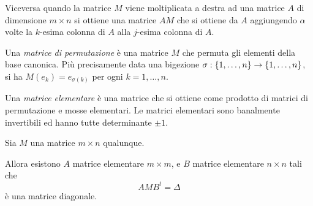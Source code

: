 \begin{definition}
Viceversa quando la matrice $M$ viene moltiplicata a destra ad una matrice $A$ di dimensione $m\times n$
si ottiene una matrice $A M$ che si ottiene da $A$ aggiungendo $\alpha$ volte la $k$-esima colonna di $A$
alla $j$-esima colonna di $A$.

Una \emph{matrice di permutazione} è una matrice $M$ che permuta gli elementi 
della base canonica. 
Più precisamente data una bigezione $\sigma: {\left\{ 1,\ldots,n \right\}} \to {\left\{ 1,\ldots,n \right\}}$, 
si ha $M(e_k) = e_{\sigma(k)}$ per ogni $k=1,\ldots,n$.

Una \emph{matrice elementare} è una matrice che si ottiene come prodotto di matrici di permutazione e mosse elementari.
Le matrici elementari sono banalmente invertibili 
ed hanno tutte determinante $\pm 1$.
\end{definition}

\begin{theorem}
\label{th:riduzione_gauss}
Sia $M$ una matrice $m\times n$ qualunque. 

Allora esistono $A$ matrice elementare $m\times m$,
e $B$ matrice elementare $n\times n$ tali che
\[
  A M B^t = \Delta
\]
è una matrice diagonale.
\end{theorem}

